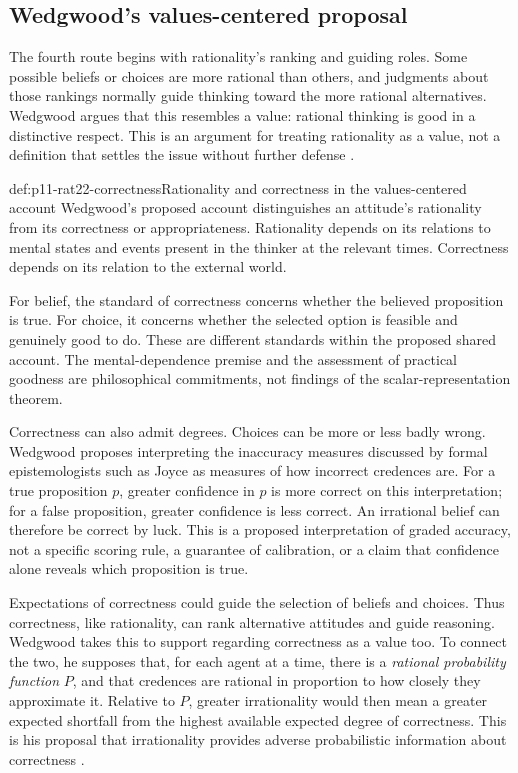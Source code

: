 \subsection{Wedgwood's values-centered proposal}

The fourth route begins with rationality's ranking and guiding roles.
Some possible beliefs or choices are more rational than others, and
judgments about those rankings normally guide thinking toward the more
rational alternatives. Wedgwood argues that this resembles a value:
rational thinking is good in a distinctive respect. This is an argument
for treating rationality as a value, not a definition that settles the
issue without further defense
\parencite[p.~143]{RalphWedgwood2021}.

\begin{hbdefinition}{def:p11-rat22-correctness}{Rationality and correctness in the values-centered account}
Wedgwood's proposed account distinguishes an attitude's rationality from
its correctness or appropriateness. Rationality depends on its relations
to mental states and events present in the thinker at the relevant times.
Correctness depends on its relation to the external world.

For belief, the standard of correctness concerns whether the believed
proposition is true. For choice, it concerns whether the selected option
is feasible and genuinely good to do. These are different standards within
the proposed shared account. The mental-dependence premise and the
assessment of practical goodness are philosophical commitments, not
findings of the scalar-representation theorem.
\end{hbdefinition}

Correctness can also admit degrees. Choices can be more or less badly
wrong. Wedgwood proposes interpreting the inaccuracy measures discussed
by formal epistemologists such as Joyce as measures of how incorrect
credences are. For a true proposition \(p\), greater confidence in \(p\)
is more correct on this interpretation; for a false proposition, greater
confidence is less correct. An irrational belief can therefore be correct
by luck. This is a proposed interpretation of graded accuracy, not a
specific scoring rule, a guarantee of calibration, or a claim that
confidence alone reveals which proposition is true.

Expectations of correctness could guide the selection of beliefs and
choices. Thus correctness, like rationality, can rank alternative attitudes
and guide reasoning. Wedgwood takes this to support regarding correctness
as a value too. To connect the two, he supposes that, for each agent at a
time, there is a \emph{rational probability function} \(P\), and that
credences are rational in proportion to how closely they approximate it.
Relative to \(P\), greater irrationality would then mean a greater expected
shortfall from the highest available expected degree of correctness.
This is his proposal that irrationality provides adverse probabilistic
information about correctness
\parencite[p.~143]{RalphWedgwood2021}.

